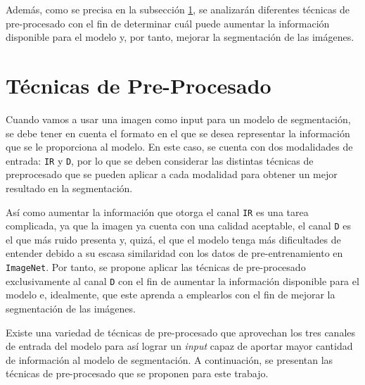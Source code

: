 \documentclass[12pt,a4paper]{report}
\begin{document}
Además, como se precisa en la subsección \ref{subsec:preprocessing_techniques}, se analizarán diferentes técnicas de pre-procesado con el fin de determinar cuál puede aumentar la información disponible para el modelo y, por tanto, mejorar la segmentación de las imágenes.

\section{Técnicas de Pre-Procesado}
\label{subsec:preprocessing_techniques}
Cuando vamos a usar una imagen como input para un modelo de segmentación, se debe tener en cuenta el formato en el que se desea representar la información que se le proporciona al modelo. En este caso, se cuenta con dos modalidades de entrada: \texttt{IR} y \texttt{D}, por lo que se deben considerar las distintas técnicas de preprocesado que se pueden aplicar a cada modalidad para obtener un mejor resultado en la segmentación.

Así como aumentar la información que otorga el canal \texttt{IR} es una tarea complicada, ya que la imagen ya cuenta con una calidad aceptable, el canal \texttt{D} es el que más ruido presenta y, quizá, el que el modelo tenga más dificultades de entender debido a su escasa similaridad con los datos de pre-entrenamiento en \texttt{ImageNet}. Por tanto, se propone aplicar las técnicas de pre-procesado exclusivamente al canal \texttt{D} con el fin de aumentar la información disponible para el modelo e, idealmente, que este aprenda a emplearlos con el fin de mejorar la segmentación de las imágenes.

Existe una variedad de técnicas de pre-procesado que aprovechan los tres canales de entrada del modelo para así lograr un \textit{input} capaz de aportar mayor cantidad de información al modelo de segmentación. A continuación, se presentan las técnicas de pre-procesado que se proponen para este trabajo.
\end{document}
